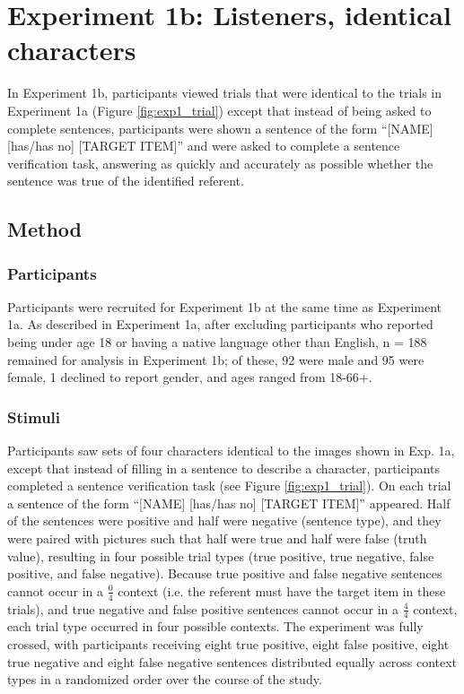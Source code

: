 \documentclass[man, floatsintext, noapacite]{apa6}
\begin{document}
\section{Experiment 1b: Listeners, identical characters}

In Experiment 1b, participants viewed trials that were identical to the trials in Experiment 1a (Figure \ref{fig:exp1_trial}) except that instead of being asked to complete sentences, participants were shown a sentence of the form ``[NAME] [has/has no] [TARGET ITEM]'' and were asked to complete a sentence verification task, answering as quickly and accurately as possible whether the sentence was true of the identified referent. 

\subsection{Method}

\subsubsection{Participants} 

Participants were recruited for Experiment 1b at the same time as Experiment 1a. As described in Experiment 1a, after excluding participants who reported being under age 18 or having a native language other than English, n = 188 remained for analysis in Experiment 1b; of these, 92 were male and 95 were female, 1 declined to report gender, and ages ranged from 18-66+.

\subsubsection{Stimuli}

Participants saw sets of four characters identical to the images shown in Exp. 1a, except that instead of filling in a sentence to describe a character, participants completed a sentence verification task (see Figure \ref{fig:exp1_trial}). On each trial a sentence of the form ``[NAME] [has/has no] [TARGET ITEM]'' appeared.  Half of the sentences were positive and half were negative (sentence type), and they were paired with pictures such that half were true and half were false (truth value), resulting in four possible trial types (true positive, true negative, false positive, and false negative).  Because true positive and false negative sentences cannot occur in a $\frac{0}{4}$ context (i.e. the referent must have the target item in these trials), and true negative and false positive sentences cannot occur in a $\frac{4}{4}$ context, each trial type occurred in four possible contexts.  The experiment was fully crossed, with participants receiving eight true positive, eight false positive, eight true negative and eight false negative sentences distributed equally across context types in a randomized order over the course of the study.  
\end{document}
